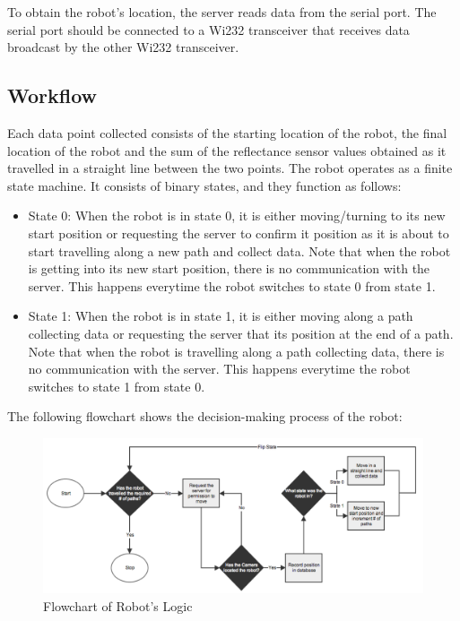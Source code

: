 \documentclass[english]{article}\usepackage[]{graphicx}\usepackage[]{color}
\begin{document}
To obtain the robot's location, the server reads data from the serial port. The serial port should be connected to a Wi232 transceiver that receives data broadcast by the other Wi232 transceiver.

\subsection{Workflow}

Each data point collected consists of the starting location of the robot, the final location of the robot and the sum of the reflectance sensor values obtained as it travelled in a straight line between the two points. The robot operates as a finite state machine. It consists of binary states, and they function as follows:
\begin{itemize}
\item State 0: When the robot is in state 0, it is either moving/turning to its new start position or requesting the server to confirm it position as it is about to start travelling along a new path and collect data. Note that when the robot is getting into its new start position, there is no communication with the server. This happens everytime the robot switches to state 0 from state 1.
\item State 1: When the robot is in state 1, it is either moving along a path collecting data or requesting the server that its position at the end of a path. Note that when the robot is travelling along a path collecting data, there is no communication with the server. This happens everytime the robot switches to state 1 from state 0.
\end{itemize}
The following flowchart shows the decision-making process of the robot:
\begin{figure}[H]
\begin{centering}

\includegraphics[width=1\linewidth]{figures/robot_flowchart}
\end{centering}

\caption{Flowchart of Robot's Logic}
\label{fig:robot-flowchart}
\end{figure}
\end{document}
